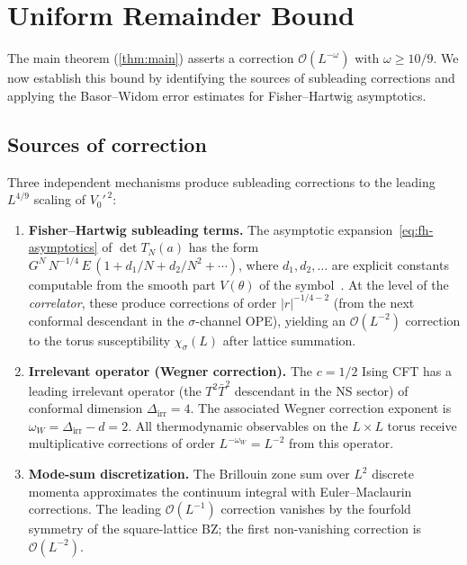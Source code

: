 \documentclass[11pt]{article}
\theoremstyle{definition}
\theoremstyle{remark}
\newcommand{\cO}{\mathcal{O}}
\begin{document}
\section{Uniform Remainder Bound}
\label{sec:remainder}

The main theorem (\cref{thm:main}) asserts a correction
$\cO(L^{-\omega})$ with $\omega \geq 10/9$. We now establish this
bound by identifying the sources of subleading corrections and
applying the Basor--Widom error estimates for Fisher--Hartwig
asymptotics.

\subsection{Sources of correction}
\label{subsec:correction-sources}

Three independent mechanisms produce subleading corrections to
the leading $L^{4/9}$ scaling of $V_0'^{\,2}$:

\begin{enumerate}
  \item \textbf{Fisher--Hartwig subleading terms.}
    The asymptotic expansion~\eqref{eq:fh-asymptotics} of
    $\det T_N(a)$ has the form
    $G^N\,N^{-1/4}\,E\,(1 + d_1/N + d_2/N^2 + \cdots)$,
    where $d_1, d_2, \ldots$ are explicit constants
    computable from the smooth part $V(\theta)$ of the
    symbol~\cite{Deift2011}. At the level of the
    \emph{correlator}, these produce corrections of order
    $|r|^{-1/4-2}$ (from the next conformal descendant in the
    $\sigma$-channel OPE), yielding an $\cO(L^{-2})$
    correction to the torus susceptibility $\chi_\sigma(L)$
    after lattice summation.

  \item \textbf{Irrelevant operator (Wegner correction).}
    The $c = 1/2$ Ising CFT has a leading irrelevant operator
    (the $T^2\bar{T}^2$ descendant in the NS sector) of
    conformal dimension $\Delta_{\mathrm{irr}} = 4$.
    The associated Wegner correction exponent is
    $\omega_W = \Delta_{\mathrm{irr}} - d = 2$.
    All thermodynamic observables on the $L \times L$ torus
    receive multiplicative corrections of order $L^{-\omega_W}
    = L^{-2}$ from this operator.

  \item \textbf{Mode-sum discretization.}
    The Brillouin zone sum over $L^2$ discrete momenta
    approximates the continuum integral with Euler--Maclaurin
    corrections. The leading $\cO(L^{-1})$ correction
    vanishes by the fourfold symmetry of the square-lattice
    BZ; the first non-vanishing correction is
    $\cO(L^{-2})$.
\end{enumerate}
\end{document}
